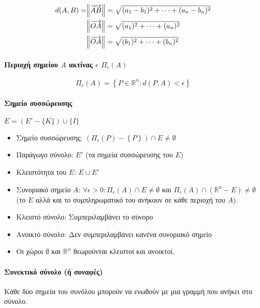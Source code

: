 \documentclass[11pt,a4paper,titlepage,draft]{article}
\begin{document}
\begin{align*}
d(A,B) = &\norm{\overrightarrow{AB}} = \sqrt{(a_1-b_1)^2 + \dots + (a_n-b_n)^2} \\
&\norm{\overrightarrow{OA}} = \sqrt{(a_1)^2 + \dots + (a_n)^2} \\
&\norm{\overrightarrow{OA}} = \sqrt{(b_1)^2 + \dots + (b_n)^2}
\end{align*}

\paragraph{Περιοχή σημείου \(Α\) ακτίνας \(\epsilon\) \(\Pi_\epsilon(A)\)}
\[
\Pi_\epsilon(A) = \left\lbrace P \in  \mathbb R ^n : d(P,A) < \epsilon \right\rbrace
\]

\paragraph{Σημείο συσσώρευσης}


\( E = (E' - \lbrace K\rbrace ) \cup \lbrace I\rbrace \)

\begin{itemize}
\item Σημείο συσσώρευσης: \( \left( \Pi_\epsilon(P) - \left\lbrace P \right\rbrace \right) \cap E \neq \emptyset \)
\item Παράγωγο σύνολο: \(Ε'\) (τα σημεία συσσώρευσης του \(Ε\))
\item Κλειστότητα του \(Ε\): \(Ε \cup E'\)
\item Συνοριακό σημείο \(Α\): \(\forall \epsilon > 0: \Pi_\epsilon(A) \cap E \neq \emptyset\) και \(\Pi_\epsilon(A) \cap \left( \mathbb R^n - E \right) \neq \emptyset\) (το \(Ε\) αλλά και το συμπληρωματικό του ανήκουν σε κάθε περιοχή του \(Α\)).
\item Κλειστό σύνολο: Συμπεριλαμβάνει το σύνορο
\item Ανοικτό σύνολο: Δεν συμπεριλαμβάνει κανένα συνοριακό σημείο
\item Οι χώροι \(\emptyset\) και \( \mathbb R ^ n \) θεωρούνται κλειστοί και ανοικτοί.
\end{itemize}

\paragraph{Συνεκτικό σύνολο (ή συναφές)}
Κάθε δύο σημεία του συνόλου μπορούν να ενωθούν με μια γραμμή που ανήκει στο σύνολο.
\end{document}
